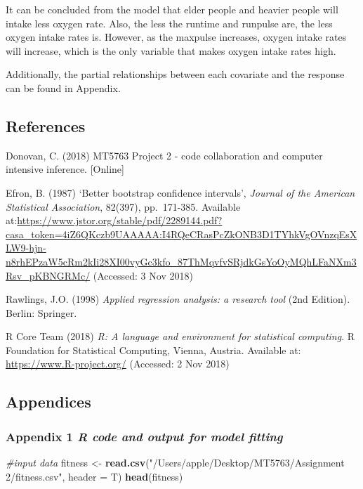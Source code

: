 \documentclass[]{article}
\newenvironment{Shaded}{\begin{snugshade}}{\end{snugshade}}
\newcommand{\KeywordTok}[1]{\textcolor[rgb]{0.13,0.29,0.53}{\textbf{#1}}}
\newcommand{\DataTypeTok}[1]{\textcolor[rgb]{0.13,0.29,0.53}{#1}}
\newcommand{\StringTok}[1]{\textcolor[rgb]{0.31,0.60,0.02}{#1}}
\newcommand{\CommentTok}[1]{\textcolor[rgb]{0.56,0.35,0.01}{\textit{#1}}}
\newcommand{\NormalTok}[1]{#1}
\begin{document}
It can be concluded from the model that elder people and heavier people
will intake less oxygen rate. Also, the less the runtime and runpulse
are, the less oxygen intake rates is. However, as the maxpulse
increases, oxygen intake rates will increase, which is the only variable
that makes oxygen intake rates high.

Additionally, the partial relationships between each covariate and the
response can be found in Appendix.

\pagebreak

\subsection{References}\label{references}

Donovan, C. (2018) MT5763 Project 2 - code collaboration and computer
intensive inference. {[}Online{]}

Efron, B. (1987) `Better bootstrap confidence intervals', \emph{Journal
of the American Statistical Association}, 82(397), pp.~171-385.
Available
at:\url{https://www.jstor.org/stable/pdf/2289144.pdf?casa_token=4iZ6QKczb9UAAAAA:I4RQeCRasPcZkONB3D1TYhkVgOVnzqEsXLW9-hjn-n8rhEPzaW5cRm2kIi28XI00vyGc3kfo_87ThMqvfvSRjdkGsYoOyMQhLFaNXm3Rsv_pKBNGRMc/}
(Accessed: 3 Nov 2018)

Rawlings, J.O. (1998) \emph{Applied regression analysis: a research
tool} (2nd Edition). Berlin: Springer.

R Core Team (2018) \emph{R: A language and environment for statistical
computing}. R Foundation for Statistical Computing, Vienna, Austria.
Available at: \url{https://www.R-project.org/} (Accessed: 2 Nov 2018)

\pagebreak

\subsection{Appendices}\label{appendices}

\subsubsection{\texorpdfstring{Appendix 1 \emph{R code and output for
model
fitting}}{Appendix 1 R code and output for model fitting}}\label{appendix-1-r-code-and-output-for-model-fitting}

\begin{Shaded}
\begin{Highlighting}[]
\CommentTok{#input data}
\NormalTok{fitness <-}\StringTok{ }\KeywordTok{read.csv}\NormalTok{(}\StringTok{"/Users/apple/Desktop/MT5763/Assignment 2/fitness.csv"}\NormalTok{, }\DataTypeTok{header =}\NormalTok{ T)}
\KeywordTok{head}\NormalTok{(fitness)}
\end{Highlighting}
\end{Shaded}
\end{document}
